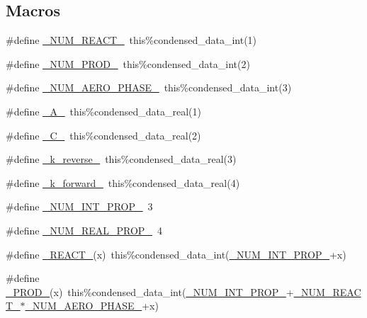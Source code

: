 \subsection*{Macros}
\begin{DoxyCompactItemize}
\item 
\#define \mbox{\hyperlink{rxn__aqueous__equilibrium_8_f90_aee1fee52189b85b8a55162815b7eb2ab}{\+\_\+\+N\+U\+M\+\_\+\+R\+E\+A\+C\+T\+\_\+}}~this\%condensed\+\_\+data\+\_\+int(1)
\item 
\#define \mbox{\hyperlink{rxn__aqueous__equilibrium_8_f90_a0ab2d7e00e334b5c52335f26ef6025e8}{\+\_\+\+N\+U\+M\+\_\+\+P\+R\+O\+D\+\_\+}}~this\%condensed\+\_\+data\+\_\+int(2)
\item 
\#define \mbox{\hyperlink{rxn__aqueous__equilibrium_8_f90_a420df3d7e04a5101c904c5965cbc9897}{\+\_\+\+N\+U\+M\+\_\+\+A\+E\+R\+O\+\_\+\+P\+H\+A\+S\+E\+\_\+}}~this\%condensed\+\_\+data\+\_\+int(3)
\item 
\#define \mbox{\hyperlink{rxn__aqueous__equilibrium_8_f90_a09731b4569901a5008e219da69e920ae}{\+\_\+\+A\+\_\+}}~this\%condensed\+\_\+data\+\_\+real(1)
\item 
\#define \mbox{\hyperlink{rxn__aqueous__equilibrium_8_f90_ac11ee8334d3e3d1551143b92e219bf44}{\+\_\+\+C\+\_\+}}~this\%condensed\+\_\+data\+\_\+real(2)
\item 
\#define \mbox{\hyperlink{rxn__aqueous__equilibrium_8_f90_a6e9328a61940094d876c725151d38b7e}{\+\_\+k\+\_\+reverse\+\_\+}}~this\%condensed\+\_\+data\+\_\+real(3)
\item 
\#define \mbox{\hyperlink{rxn__aqueous__equilibrium_8_f90_aec5ee75b3bb072d9e66ce57ea2a4cfbf}{\+\_\+k\+\_\+forward\+\_\+}}~this\%condensed\+\_\+data\+\_\+real(4)
\item 
\#define \mbox{\hyperlink{rxn__aqueous__equilibrium_8_f90_a54f7194dc6a244f7eb7a78f88b3362ba}{\+\_\+\+N\+U\+M\+\_\+\+I\+N\+T\+\_\+\+P\+R\+O\+P\+\_\+}}~3
\item 
\#define \mbox{\hyperlink{rxn__aqueous__equilibrium_8_f90_a242fac7fe42c0d62936c65735dc023a6}{\+\_\+\+N\+U\+M\+\_\+\+R\+E\+A\+L\+\_\+\+P\+R\+O\+P\+\_\+}}~4
\item 
\#define \mbox{\hyperlink{rxn__aqueous__equilibrium_8_f90_a2465fb6c1cce932a0bb29dac2975ee64}{\+\_\+\+R\+E\+A\+C\+T\+\_\+}}(x)~this\%condensed\+\_\+data\+\_\+int(\mbox{\hyperlink{sub__model___u_n_i_f_a_c_8_f90_a54f7194dc6a244f7eb7a78f88b3362ba}{\+\_\+\+N\+U\+M\+\_\+\+I\+N\+T\+\_\+\+P\+R\+O\+P\+\_\+}}+x)
\item 
\#define \mbox{\hyperlink{rxn__aqueous__equilibrium_8_f90_ad730666d44e45e220232510d9e15ec79}{\+\_\+\+P\+R\+O\+D\+\_\+}}(x)~this\%condensed\+\_\+data\+\_\+int(\mbox{\hyperlink{sub__model___u_n_i_f_a_c_8_f90_a54f7194dc6a244f7eb7a78f88b3362ba}{\+\_\+\+N\+U\+M\+\_\+\+I\+N\+T\+\_\+\+P\+R\+O\+P\+\_\+}}+\mbox{\hyperlink{rxn__troe_8_f90_aee1fee52189b85b8a55162815b7eb2ab}{\+\_\+\+N\+U\+M\+\_\+\+R\+E\+A\+C\+T\+\_\+}}$\ast$\mbox{\hyperlink{rxn___s_i_m_p_o_l__phase__transfer_8c_a420df3d7e04a5101c904c5965cbc9897}{\+\_\+\+N\+U\+M\+\_\+\+A\+E\+R\+O\+\_\+\+P\+H\+A\+S\+E\+\_\+}}+x)

\end{DoxyCompactItemize}
